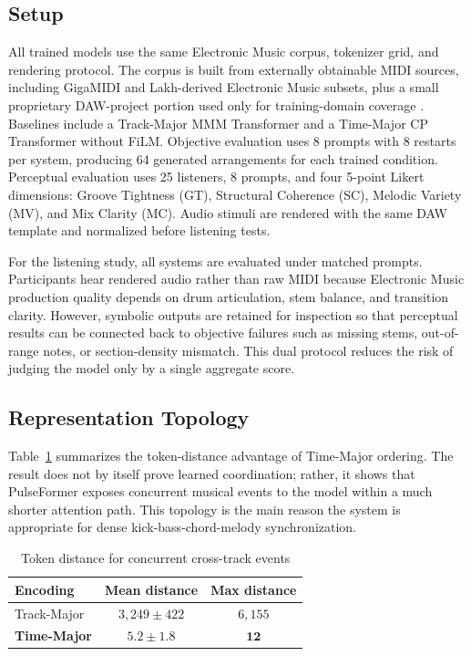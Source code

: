 \documentclass[conference]{conference-latex-template_10-17-19/IEEEtran}
\begin{document}
\subsection{Setup}
All trained models use the same Electronic Music corpus, tokenizer grid, and rendering protocol. The corpus is built from externally obtainable MIDI sources, including GigaMIDI and Lakh-derived Electronic Music subsets, plus a small proprietary DAW-project portion used only for training-domain coverage \cite{fradet2024gigamidi,raffel2016lakh}. Baselines include a Track-Major MMM Transformer and a Time-Major CP Transformer without FiLM. Objective evaluation uses 8 prompts with 8 restarts per system, producing 64 generated arrangements for each trained condition. Perceptual evaluation uses 25 listeners, 8 prompts, and four 5-point Likert dimensions: Groove Tightness (GT), Structural Coherence (SC), Melodic Variety (MV), and Mix Clarity (MC). Audio stimuli are rendered with the same DAW template and normalized before listening tests.

For the listening study, all systems are evaluated under matched prompts. Participants hear rendered audio rather than raw MIDI because Electronic Music production quality depends on drum articulation, stem balance, and transition clarity. However, symbolic outputs are retained for inspection so that perceptual results can be connected back to objective failures such as missing stems, out-of-range notes, or section-density mismatch. This dual protocol reduces the risk of judging the model only by a single aggregate score.

\subsection{Representation Topology}
Table~\ref{tab:topology} summarizes the token-distance advantage of Time-Major ordering. The result does not by itself prove learned coordination; rather, it shows that PulseFormer exposes concurrent musical events to the model within a much shorter attention path. This topology is the main reason the system is appropriate for dense kick-bass-chord-melody synchronization.

\begin{table}[t]
\caption{Token distance for concurrent cross-track events}
\label{tab:topology}
\centering\small
\begin{tabular}{@{}lcc@{}}
\toprule
Encoding & Mean distance & Max distance \\ \midrule
Track-Major & $3{,}249\pm422$ & $6{,}155$ \\
\textbf{Time-Major} & $\mathbf{5.2\pm1.8}$ & $\mathbf{12}$ \\ \bottomrule
\end{tabular}
\end{table}
\end{document}
